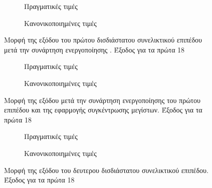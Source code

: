 \begin{figure}[htbp]
    \begin{subfigure}{0.5\textwidth}
        
        \caption{Πραγματικές τιμές}
        \label{fig:subim3}
    \end{subfigure}
    \begin{subfigure}{0.5\textwidth}
        
        \caption{Κανονικοποιημένες τιμές}
        \label{fig:subim4}
    \end{subfigure}
    \caption{Μορφή της εξόδου του πρώτου δισδιάστατου συνελικτικού επιπέδου μετά την συνάρτηση ενεργοποίησης . Έξοδος για τα πρώτα 18 }
\end{figure}

\begin{figure}[htbp]
    \begin{subfigure}{0.5\textwidth}
        
        \caption{Πραγματικές τιμές}
        \label{fig:subim5}
    \end{subfigure}
    \begin{subfigure}{0.5\textwidth}
        
        \caption{Κανονικοποιημένες τιμές}
        \label{fig:subim6}
    \end{subfigure}
    \caption{Μορφή της εξόδου μετά την συνάρτηση ενεργοποίησης  του πρώτου επιπέδου και της εφαρμογής συγκέντρωσης μεγίστων. Έξοδος για τα πρώτα 18 }
\end{figure}

\begin{figure}[htbp]
    \begin{subfigure}{0.5\textwidth}
        
        \caption{Πραγματικές τιμές}
        \label{fig:subim7}
    \end{subfigure}
    \begin{subfigure}{0.5\textwidth}
        
        \caption{Κανονικοποιημένες τιμές}
        \label{fig:subim8}
    \end{subfigure}
    \caption{Μορφή της εξόδου του δευτερου δισδιάστατου συνελικτικού επιπέδου. Έξοδος για τα πρώτα 18 }
\end{figure}

